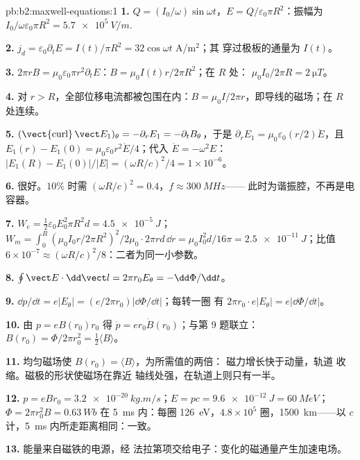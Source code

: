 \begin{solution}{pb:b2:maxwell-equations:1}
\textbf{1.} $Q = (I_0/\omega)\sin\omega t$，$E = Q/\varepsilon_0\pi R^2$：振幅为 $I_0/\omega\varepsilon_0
\pi R^2 = \qty{5.7e5}{V/m}$.

\textbf{2.} $j_d = \varepsilon_0\partial_tE = I(t)/\pi R^2 = 32\cos\omega t$ A/m$^2$；其
穿过极板的通量为 $I(t)$。

\textbf{3.} $2\pi rB = \mu_0\varepsilon_0\pi r^2\partial_tE$：$B = \mu_0I(t)r/2\pi R^2$；在 $R$ 处：
$\mu_0I_0/2\pi R = \qty{2}{\micro T}$。

\textbf{4.} 对 $r > R$，全部位移电流都被包围在内：$B =
\mu_0I/2\pi r$，即导线的磁场；在 $R$ 处连续。

\textbf{5.} $(\operatorname{\vect{curl}}\vect E_1)_\theta = -\partial_rE_1 = -\partial_tB_\theta$，于是 $\partial_rE_1
= \mu_0\varepsilon_0(r/2)\ddot E$，且 $E_1(r) - E_1(0) = \mu_0\varepsilon_0r^2\ddot E/4$；代入
$\ddot E = -\omega^2E$：$|E_1(R) - E_1(0)|/|E| = (\omega R/c)^2/4 = 1 \times 10^{-6}$。

\textbf{6.} 很好。$10\%$ 时需 $(\omega R/c)^2 = 0.4$，$f \approx \qty{300}{MHz}$——
此时为谐振腔，不再是电容器。

\textbf{7.} $W_e = \tfrac12\varepsilon_0E_0^2\pi R^2d = \qty{4.5e-5}{J}$；$W_m = \int_0^R(\mu_0I_0r/
2\pi R^2)^2/2\mu_0\cdot2\pi rd\,\dd r = \mu_0I_0^2d/16\pi = \qty{2.5e-11}{J}$；比值 $6 \times
10^{-7} \approx (\omega R/c)^2/8$：二者为同一小参数。

\textbf{8.} $\oint\vect E\cdot\dd\vect l = 2\pi r_0E_\theta = -\dd\Phi/\dd t$。

\textbf{9.} $\dd p/\dd t = e|E_\theta| = (e/2\pi r_0)|\dd\Phi/\dd t|$；每转一圈
有 $2\pi r_0\cdot e|E_\theta| = e|\dd\Phi/\dd t|$。

\textbf{10.} 由 $p = eB(r_0)r_0$ 得 $\dot p = er_0\dot B(r_0)$；与第 9 题联立：
$B(r_0) = \Phi/2\pi r_0^2 = \tfrac12\langle B\rangle$。

\textbf{11.} 均匀磁场使 $B(r_0) = \langle B\rangle$，为所需值的两倍：
磁力增长快于动量，轨道
收缩。磁极的形状使磁场在靠近
轴线处强，在轨道上则只有一半。

\textbf{12.} $p = eBr_0 = \qty{3.2e-20}{kg.m/s}$；$E = pc = \qty{9.6e-12}{J} = \qty{60}{MeV}$；
$\Phi = 2\pi r_0^2B = \qty{0.63}{Wb}$ 在 \qty{5}{ms} 内：每圈 \qty{126}{eV}，$4.8 \times
10^5$ 圈，\qty{1500}{km}——以 $c$ 计，\qty{5}{ms} 内所走距离相同：一致。

\textbf{13.} 能量来自磁铁的电源，经
法拉第项交给电子：变化的磁通量产生加速电场。


\end{solution}
